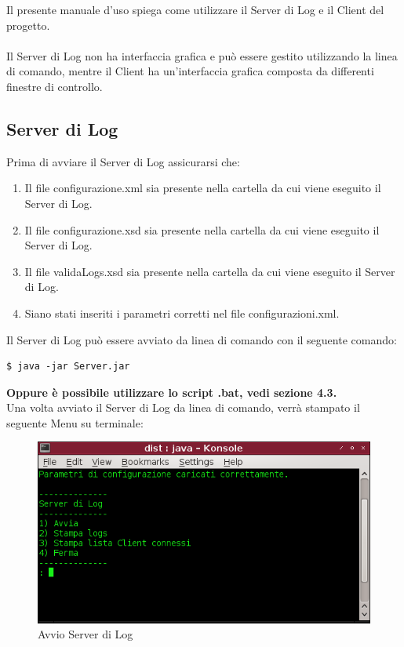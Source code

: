 \documentclass[a4paper, 11pt]{article} %
\begin{document}
Il presente manuale d'uso spiega come utilizzare il Server di Log e il Client del progetto.\\
\\
Il Server di Log non ha interfaccia grafica e pu\`o essere gestito utilizzando la linea di comando, mentre il Client ha un'interfaccia grafica composta da differenti finestre di controllo.

\subsection{Server di Log}

Prima di avviare il Server di Log assicurarsi che:
\begin{enumerate}
\item Il file configurazione.xml sia presente nella cartella da cui viene eseguito il Server di Log.
\item Il file configurazione.xsd sia presente nella cartella da cui viene eseguito il Server di Log.
\item Il file validaLogs.xsd sia presente nella cartella da cui viene eseguito il Server di Log.
\item Siano stati inseriti i parametri corretti nel file configurazioni.xml.
\end{enumerate}
\vspace{0.5cm}
Il Server di Log pu\`o essere avviato da linea di comando con il seguente comando:
\lstset{language=bash}
\begin{lstlisting}[frame=single]
$ java -jar Server.jar
\end{lstlisting}
\textbf{Oppure \`e possibile utilizzare lo script .bat, vedi sezione 4.3.}\\
\clearpage
\hspace{-0.8cm}
Una volta avviato il Server di Log da linea di comando, verr\`a stampato il seguente Menu su terminale:\\
\begin{center}
\begin{figure}[H]
\vspace{-1.0cm}
\includegraphics[width=1.0\textwidth]{images/server_di_log-1.png}
\vspace{-0.6cm}
\caption{Avvio Server di Log}
\end{figure}
\end{center}
\end{document}
